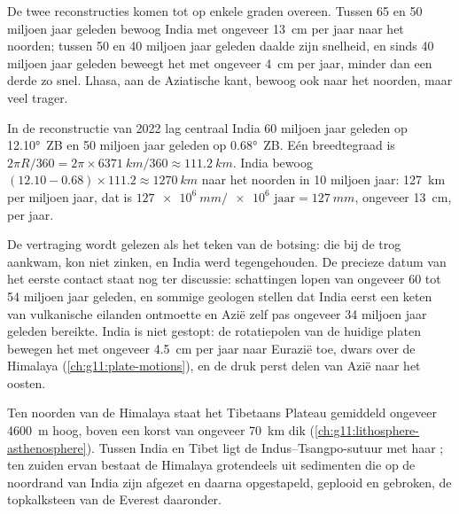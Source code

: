 De twee reconstructies komen tot op enkele graden overeen. Tussen 65 en 50 miljoen
jaar geleden bewoog India met ongeveer \qty{13}{cm} per jaar naar het noorden; tussen 50 en 40
miljoen jaar geleden daalde zijn snelheid, en
sinds 40 miljoen jaar geleden beweegt het met ongeveer \qty{4}{cm} per jaar, minder
dan een derde zo snel. Lhasa, aan de Aziatische kant, bewoog ook naar het noorden, maar veel
trager.

\begin{example}\label{ex:g12:mountain-building:india}
In de reconstructie van 2022 lag centraal India 60 miljoen jaar geleden op \ang{12.10}~ZB
en 50 miljoen jaar geleden op \ang{0.68}~ZB. Eén breedtegraad is
$2\pi R/360 = 2\pi \times \qty{6371}{km}/360 \approx \qty{111.2}{km}$. India
bewoog $(12.10 - 0.68) \times 111.2 \approx \qty{1270}{km}$ naar het noorden in 10
miljoen jaar: \qty{127}{km} per miljoen jaar, dat is $\qty{127e6}{mm} /
\num{e6}\text{ jaar} = \qty{127}{mm}$, ongeveer \qty{13}{cm}, per jaar.
\end{example}

De vertraging wordt gelezen als het teken van de botsing: 
die bij de trog aankwam, kon niet zinken, en India werd tegengehouden. De precieze datum van het eerste contact staat nog ter discussie: schattingen
lopen van ongeveer 60 tot 54 miljoen jaar geleden, en sommige geologen stellen dat
India eerst een keten van vulkanische eilanden ontmoette en Azië zelf pas
ongeveer 34 miljoen jaar geleden bereikte. India is niet gestopt: de rotatiepolen van
de huidige platen bewegen het met ongeveer \qty{4.5}{cm} per jaar naar Eurazië toe, dwars over
de Himalaya (\cref{ch:g11:plate-motions}), en de druk perst delen van
Azië naar het oosten.

Ten noorden van de Himalaya staat het Tibetaans Plateau gemiddeld ongeveer \qty{4600}{m} hoog,
boven een korst van ongeveer \qty{70}{km} dik
(\cref{ch:g11:lithosphere-asthenosphere}). Tussen India en Tibet ligt de
Indus--Tsangpo-sutuur met haar ; ten zuiden ervan bestaat de Himalaya
grotendeels uit sedimenten die op de noordrand van India zijn afgezet en daarna opgestapeld,
geplooid en gebroken, de topkalksteen van de Everest daaronder.

